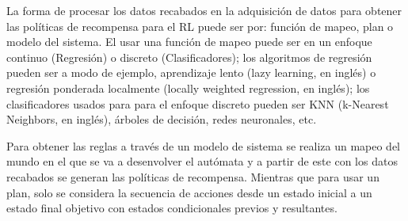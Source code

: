 La forma de procesar los datos recabados en la adquisici\'on de datos para 
 obtener las pol\'iticas de recompensa para el RL puede ser por: funci\'on 
 de mapeo, plan o modelo del sistema. El usar una funci\'on de mapeo 
 \cite{ARGALL2009469} puede ser en un enfoque continuo (Regresi\'on) o 
 discreto (Clasificadores); los algoritmos de regresi\'on pueden ser a modo 
 de ejemplo, aprendizaje lento (lazy learning, en ingl\'es) o regresi\'on 
 ponderada localmente (locally weighted regression, en ingl\'es); los 
 clasificadores usados para para el enfoque discreto pueden ser KNN 
 (k-Nearest Neighbors, en ingl\'es), \'arboles de decisi\'on, redes
 neuronales, etc.
 

Para obtener las reglas a trav\'es de un modelo de sistema\cite{ARGALL2009469}
 se realiza un mapeo del mundo en el que se va a desenvolver el aut\'omata 
 y a partir de este con los datos recabados se generan las pol\'iticas de 
 recompensa. Mientras que para usar un plan\cite{ARGALL2009469}, solo se 
 considera la secuencia de acciones desde un estado inicial a un estado final 
 objetivo con estados condicionales previos y resultantes. 
